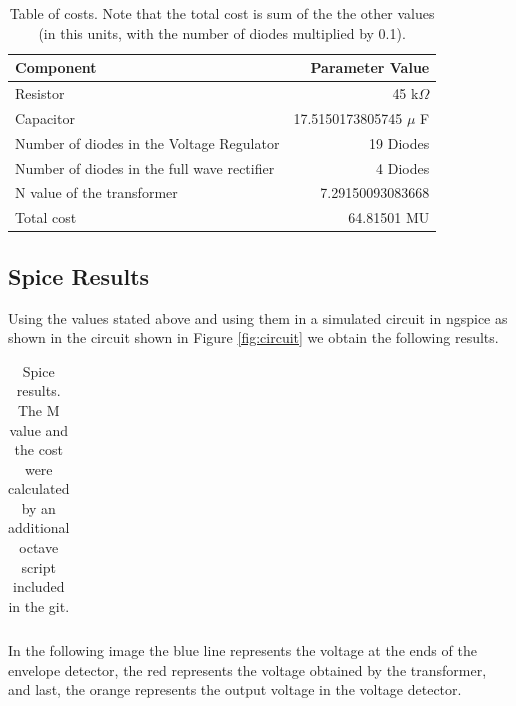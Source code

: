 \begin{table}[h]
  \centering
  \begin{tabular}{|l|r|}
    \hline    
    Component & Parameter Value \\
    \hline
    Resistor & 45 k$\Omega$ \\
    \hline
    Capacitor & 17.5150173805745 $\mu$ F \\
    \hline
    Number of diodes in the Voltage Regulator & 19 Diodes \\
    \hline
    Number of diodes in the full wave rectifier & 4 Diodes \\
    \hline
    N value of the transformer & 7.29150093083668 \\
    \hline
    Total cost & 64.81501 MU \\
    \hline
  \end{tabular}
  \caption{Table of costs. Note that the total cost is sum of the the other values (in this units, with the number of diodes multiplied by 0.1).}
  \label{tab:components}
\end{table}

\subsection{Spice Results}
 Using the values stated above and using them in a simulated circuit in ngspice as shown in the circuit shown in Figure \ref{fig:circuit} we obtain the following results.
 

\begin{table}[h]
  \centering
  \begin{tabular}{|l|r|}
    \hline    
    
  \end{tabular}
  \caption{Spice results. The M value and the cost were calculated by an additional octave script included in the git.}
  \label{tab:info}
\end{table}

\vspace{1cm} 
In the following image the blue line represents the voltage at the ends of the envelope detector, the red represents the voltage obtained by the transformer, and last, the orange represents the output voltage in the voltage detector.

